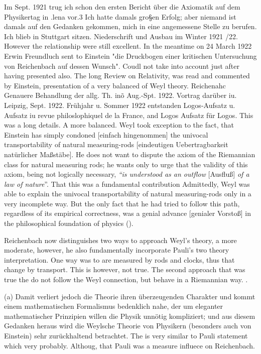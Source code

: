 \documentclass[draft]{article}
\begin{document}
Im Sept. 1921 trug ich schon den ersten Bericht \"uber die Axiomatik auf dem Physikertag in .lena vor.3 Ich hatte damals gro§en Erfolg; aber niemand ist damals auf den Gedanken gekommen, mich in eine angemessene Stelle zu berufen. Ich blieb in Stuttgart sitzen. Niederschrift und Ausbau im Winter 1921 /22. However the relationship were still excellent. In the meantime on 24 March 1922 Erwin Freundluch sent to Einstein "die Druckbogen einer kritischen Untersuchung von Reichenbach auf dessen Wunsch". Coudl not take into account just after having presented also. The long Review on Relativity, was read and commented by Einstein, presentation of a very balanced of Weyl theory. Reichenahc Genauere Behandlung der allg. Th. inõ Aug.-Spt. 1922. Vortrag dar\"uber iu. Leipzig, Sept. 1922. Fr\"uhjahr u. Sommer 1922 entstanden Logos-Aufsatz u. Aufsatz iu revue philoslophiquel de la France, and Logos Aufsatz für Logos. This was a long details. A more balanced. Weyl took exception to the fact, that Einstein has simply condoned [einfach hingenommen] the univocal transportability of natural measuring-rods [eindeutigen Uebertragbarkeit natürlicher Maßstäbe]. He does not want to dispute the axiom of the Riemannian class for natural measuring rods; he wants only to urge that the validity of this axiom, being not logically necessary, \emph{``is understood as an outflow }[Ausfluß]\emph{ of a law of nature}''. That this was a fundamental contribution Admittedly, Weyl was able to explain the univocal transportability of natural measuring-rods only in a very incomplete way. But the only fact that he had tried to follow this path, regardless of its empirical correctness, was a genial advance [genialer Vorstoß] in the philosophical foundation of physics (\citealp[367f.]{Reichenbach1921}).

Reichenbach now distinguishes two ways to approach Weyl's theory, a more moderate, however, he also fundamentally incorporate Pauli's two theory interpretation. One way was to are measured by rods and clocks, thus that change by transport. This is however, not true. The second approach that was true the do not follow the Weyl connection, but behave in a Riemannian way. . 

(a) Damit verliert jedoch die Theorie ihren überzeugenden Charakter und kommt einem mathematischen Formalismus bedenklich nahe, der um eleganter mathematischer Prinzipien willen die Physik unnötig kompliziert; und aus diesem Gedanken heraus wird die Weylsche Theorie von Physikern (besonders auch von Einstein) sehr zurückhaltend betrachtet. The is very similar to Pauli statement which very probably. Althoug, that Pauli was a measure influece on Reichenbach.
\end{document}
